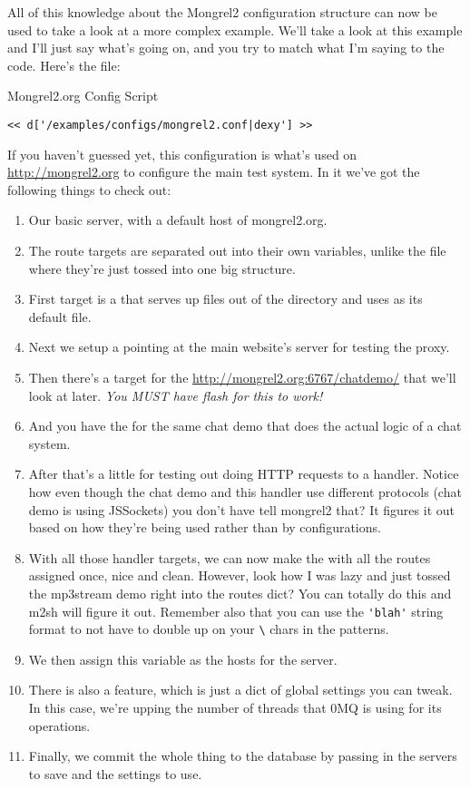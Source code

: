 All of this knowledge about the Mongrel2 configuration structure can now be used to take a look at
a more complex example.  We'll take a look at this example and I'll just say what's
going on, and you try to match what I'm saying to the code.  Here's the  file:

\begin{code}{Mongrel2.org Config Script}
\begin{lstlisting}
<< d['/examples/configs/mongrel2.conf|dexy'] >>
\end{lstlisting}
\end{code}

If you haven't guessed yet, this configuration is what's used on \url{http://mongrel2.org}
to configure the main test system.  In it we've got the following things to check out:

\begin{enumerate}
\item Our basic server, with a default host of mongrel2.org.
\item The route targets are separated out into their own variables, unlike the  file
    where they're just tossed into one big structure.
\item First target is a  that serves up files out of the  directory and uses 
    as its default file.
\item Next we setup a  pointing at the main website's server for testing the proxy.
\item Then there's a  target for the \url{http://mongrel2.org:6767/chatdemo/} that we'll look at later. \emph{You MUST have flash for this to work!}
\item And you have the  for the same chat demo that does the actual logic of a chat system.
\item After that's a little  for testing out doing HTTP requests to a handler.  Notice how even
    though the chat demo and this handler use different protocols (chat demo is using JSSockets) you don't have
    tell mongrel2 that?  It figures it out based on how they're being used rather than by configurations.
\item With all those handler targets, we can now make the   with all the routes
    assigned once, nice and clean.  However, look how I was lazy and just tossed the mp3stream demo
    right into the routes dict?  You can totally do this and m2sh will figure it out.  Remember also that
    you can use the \verb|'blah'| string format to not have to double up on your \verb|\| chars in the patterns.
\item We then assign this  variable as the hosts for the  server.
\item There is also a  feature, which is just a dict of global settings you can tweak.  In this case,
    we're upping the number of threads that 0MQ is using for its operations.
\item Finally, we commit the whole thing to the database by passing in the servers to save and the settings
    to use.
\end{enumerate}

